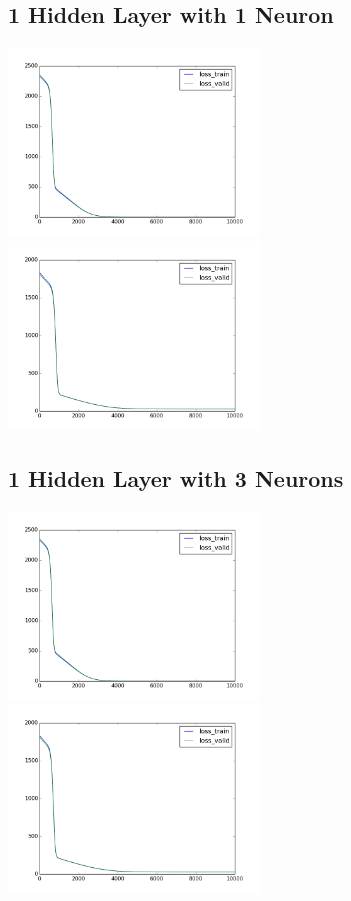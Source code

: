 \documentclass[conference]{IEEEtran}
\begin{document}
\subsection{1 Hidden Layer with 1 Neuron}

\includegraphics[width=0.5\textwidth]{set1-[1].png}
\includegraphics[width=0.5\textwidth]{set2-[1].png}


\subsection{1 Hidden Layer with 3 Neurons}

\includegraphics[width=0.5\textwidth]{set1-[3].png}
\includegraphics[width=0.5\textwidth]{set2-[3].png}
\end{document}
